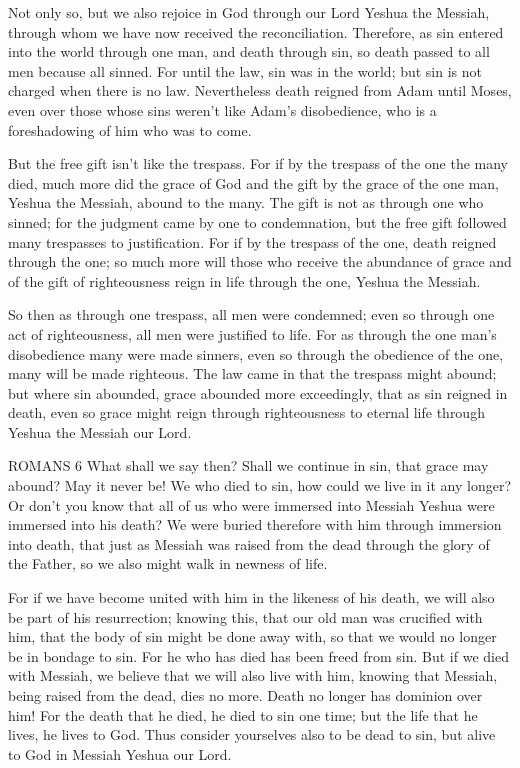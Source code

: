 \myverse{}Not only so, but we also rejoice in God through our Lord Yeshua the Messiah,
through whom we have now received the reconciliation.
\myverse{}Therefore, as sin entered into the world through one man, and death through
sin, so death passed to all men because all sinned.
\myverse{}For until the law, sin was in the world; but sin is not charged when there
is no law.
\myverse{}Nevertheless death reigned from Adam until Moses, even over those whose sins
weren’t like Adam’s disobedience, who is a foreshadowing of him who was to come.

\myverse{}But the free gift isn’t like the trespass. For if by the trespass
of the one the many died, much more did the grace of God and the gift by the grace of the one man, Yeshua the Messiah,
abound to the many.
\myverse{}The gift is not as through one who sinned; for the judgment came by one to
condemnation, but the free gift followed many trespasses to justification.
\myverse{}For if by the trespass of the one, death reigned through the one; so much
more will those who receive the abundance of grace and of the gift of righteousness reign in life through
the one, Yeshua the Messiah.

\myverse{}So then as through one trespass, all men were condemned; even
so through one act of righteousness, all men were justified to life.
\myverse{}For as through the one man’s disobedience many were made sinners, even so
through the obedience of the one, many will be made righteous.
\myverse{}The law came in that the trespass might abound; but where sin abounded, grace
abounded more exceedingly,
\myverse{}that as sin reigned in death, even so grace might reign through righteousness
to eternal life through Yeshua the Messiah our Lord.


ROMANS 6
\mychapter{} \myverse*{}What shall we say then? Shall we continue in sin, that grace may
abound?
\myverse{}May it never be! We who died to sin, how could we live in it any longer?
\myverse{}Or don’t you know that all of us who were immersed into Messiah Yeshua were
immersed into his death?
\myverse{}We were buried therefore with him through immersion into death, that just as
Messiah was raised from the dead through the glory of the Father, so we also might walk in newness of
life.

\myverse{}For if we have become united with him in the likeness of his death,
we will also be part of his resurrection;
\myverse{}knowing this, that our old man was crucified with him, that the body of sin
might be done away with, so that we would no longer be in bondage to sin.
\myverse{}For he who has died has been freed from sin.
\myverse{}But if we died with Messiah, we believe that we will also live with him,
\myverse{}knowing that Messiah, being raised from the dead, dies no more. Death no longer
has dominion over him!
\myverse{}For the death that he died, he died to sin one time; but the life that he
lives, he lives to God.
\myverse{}Thus consider yourselves also to be dead to sin, but alive to God in Messiah
Yeshua our Lord.

